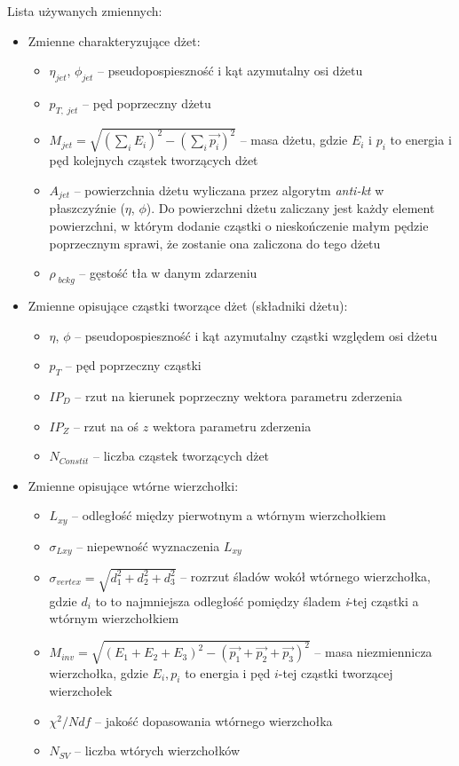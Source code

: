 Lista używanych zmiennych:
\begin{itemize}
	\item Zmienne charakteryzujące dżet:
	\begin{itemize}	
		\item $\eta_{jet}$, $\phi_{jet}$ -- pseudopospieszność i kąt azymutalny osi dżetu
		\item $p_{T,\;jet}$ -- pęd poprzeczny dżetu
		\item $M_{jet} = \sqrt{ \left(\sum_i E_i\right)^2  -  \left(\sum_i \vec{p_i}\right)^2 }$ -- masa dżetu, gdzie $E_i$ i $p_i$ to energia i pęd kolejnych cząstek tworzących dżet
		\item $A_{jet}$ -- powierzchnia dżetu wyliczana przez algorytm \textit{anti-kt} w płaszczyźnie ($\eta$, $\phi$). Do powierzchni dżetu zaliczany jest każdy element powierzchni, w którym dodanie cząstki o nieskończenie małym pędzie poprzecznym sprawi, że zostanie ona zaliczona do tego dżetu \cite{Cacciari:2007fd}
		\item $\rho_{\;bckg}$ -- gęstość tła w danym zdarzeniu
	\end{itemize}
	
	\item Zmienne opisujące cząstki tworzące dżet (składniki dżetu):
	\begin{itemize}	
		\item $\eta$, $\phi$ -- pseudopospieszność i kąt azymutalny cząstki względem osi dżetu
		\item $p_T$ -- pęd poprzeczny cząstki
		\item $IP_D$ -- rzut na kierunek poprzeczny wektora parametru zderzenia
		\item $IP_Z$ -- rzut na oś $z$ wektora parametru zderzenia
		\item $N_{Constit}$ -- liczba cząstek tworzących dżet
	\end{itemize}	
	
	
	\item Zmienne opisujące wtórne wierzchołki:
	\begin{itemize}	
		\item $L_{xy}$ -- odległość między pierwotnym a wtórnym wierzchołkiem 
		\item $\sigma_{Lxy}$ -- niepewność wyznaczenia $L_{xy}$
		\item $\sigma_{vertex} = \sqrt{d_1^2 + d_2^2 + d_3^2}$ -- rozrzut śladów  wokół wtórnego wierzchołka, gdzie $d_i$ to to najmniejsza odległość pomiędzy śladem \textit{i}-tej cząstki a wtórnym wierzchołkiem
		\item $M_{inv} = \sqrt{(E_1 + E_2 + E_3)^2 - (\vec{p_1} + \vec{p_2} + \vec{p_3})^2}$ -- masa niezmiennicza wierzchołka, gdzie $E_i, p_i$ to energia i pęd $i$-tej cząstki tworzącej wierzchołek
		\item $\chi^2/Ndf$ -- jakość dopasowania wtórnego wierzchołka
		\item $N_{SV}$ -- liczba wtórych wierzchołków

	\end{itemize}
\end{itemize}


